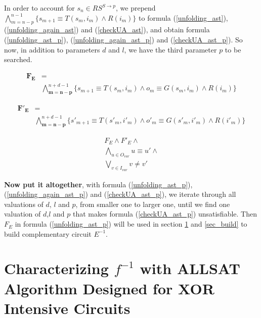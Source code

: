 \documentclass[journal]{IEEEtran}
\begin{document}
In order to account for $s_n\in RS^{S\to p}$,
we prepend $\bigwedge_{m=n-p}^{n-1}\big\{s_{m+1}\equiv T(s_m,i_m)\wedge R(i_m)\big\}$ to formula (\ref{unfolding_ast}),(\ref{unfolding_again_ast}) and (\ref{checkUA_ast}),
and obtain formula (\ref{unfolding_ast_p}), (\ref{unfolding_again_ast_p}) and (\ref{checkUA_ast_p}).
So now, in addition to parameters $d$ and $l$,
we have the third parameter $p$ to be searched.

\begin{equation}\label{unfolding_ast_p}
\begin{split}
\boldsymbol{F_E} &= \\
&
\bigwedge_{\boldsymbol{m=n-p}}^{n+d-1}
\Big\{
s_{m+1}\equiv T(s_m,i_m) \wedge
o_m\equiv G(s_m,i_m) \wedge
R (i_m)
\Big\}
\end{split}
\end{equation}

\begin{equation}\label{unfolding_again_ast_p}
\begin{split}
\boldsymbol{F'_E} &= \\
&
\bigwedge_{\boldsymbol{m=n-p}}^{n+d-1}
\Big\{
s'_{m+1}\equiv T(s'_m,i'_m) \wedge
o'_m\equiv G(s'_m,i'_m) \wedge
R (i'_m)
\Big\}
\end{split}
\end{equation}

\begin{equation}\label{checkUA_ast_p}
\begin{array}{c}
F_E\wedge F'_E \wedge \\
\bigwedge_{u\in O_{var}} u\equiv u'\wedge \\
\bigvee_{v\in I_{var}} v\ne v'
\end{array}
\end{equation}

\textbf{Now put it altogether},
with formula (\ref{unfolding_ast_p}), (\ref{unfolding_again_ast_p}) and (\ref{checkUA_ast_p}),
we iterate through all valuations of $d$, $l$ and $p$,
from smaller one to larger one,
until we find one valuation of $d$,$l$ and $p$ that makes formula (\ref{checkUA_ast_p}) unsatisfiable.
Then $F_E$ in formula (\ref{unfolding_ast_p}) will be used in section \ref{sec_buildF} and \ref{sec_build} to build complementary circuit $E^{-1}$.

\section{Characterizing $f^{-1}$ with ALLSAT Algorithm Designed for XOR Intensive Circuits}\label{sec_buildF}
\end{document}
